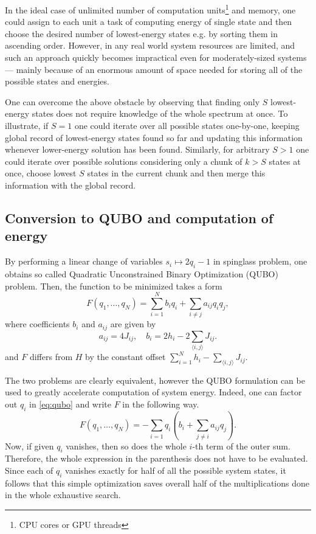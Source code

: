 In the ideal case of unlimited number of computation units\footnote{CPU cores or GPU threads} and memory, one could assign to each unit a task of computing energy of single state and then choose the desired number of lowest-energy states e.g. by sorting them in ascending order. However, in any real world system resources are limited, and such an approach quickly becomes impractical even for moderately-sized systems --- mainly because of an enormous amount of space needed for storing all of the possible states and energies.

One can overcome the above obstacle by observing that finding only $S$ lowest-energy states does not require knowledge of the whole spectrum at once.
To illustrate, if $S=1$ one could iterate over all possible states one-by-one, keeping global record of lowest-energy states found so far and updating this information whenever lower-energy solution has been found. Similarly, for arbitrary $S > 1$ one could iterate over possible solutions considering only a chunk of $k > S$ states at once, choose lowest $S$ states in the current chunk and then merge this information with the global record.


\subsection{Conversion to QUBO and computation of energy}
By performing a linear change of variables $s_i \mapsto 2q_i-1$ in spinglass problem, one obtains so called Quadratic Unconstrained Binary Optimization (QUBO) problem. Then, the function to be minimized takes a form
\begin{equation}
\label{eq:qubo}
    F(q_1, \ldots, q_N) = \sum_{i=1}^N b_iq_i + \sum_{i \ne j} a_{ij} q_i q_j,
\end{equation}
where coefficients $b_i$ and $a_{ij}$ are given by
\begin{equation}
\label{eq:toQUBO}
a_{ij}= 4J_{ij},
\quad 
b_i= 2h_i - 2 \sum_{\langle i, j \rangle} J_{ij}.
\end{equation}
and $F$ differs from $H$ by the constant offset $\sum_{i=1}^N h_i - \sum_{\langle i, j \rangle} J_{ij}$.

The two problems are clearly equivalent, however the QUBO formulation can be used to greatly accelerate computation of system energy. Indeed, one can factor out $q_i$ in \eqref{eq:qubo} and write $F$ in the following way.
\begin{equation}
    F(q_1, \ldots, q_N) = -\sum_{i=1}q_i \left(b_i + \sum_{j\ne i} a_{ij} q_j \right).
\end{equation}
Now, if given $q_i$ vanishes, then so does the whole $i$-th term of the outer sum. Therefore, the whole expression in the parenthesis does not have to be evaluated. Since each of $q_i$ vanishes exactly for half of all the possible system states, it follows that this simple optimization saves overall half of the multiplications done in the whole exhaustive search.

